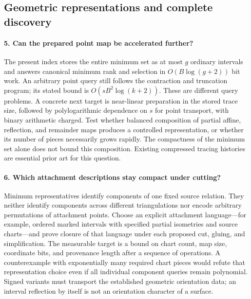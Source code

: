 \subsection{Geometric representations and complete discovery}

\paragraph{5. Can the prepared point map be accelerated further?}
The present index stores the entire minimum set as at most $g$ ordinary
intervals and answers canonical minimum rank and selection in
$O(B\log(g+2))$ bit work. An arbitrary point query still follows the
contraction and truncation program; its stated bound is
$O(sB^2\log(k+2))$. These are different query problems. A concrete next
target is near-linear preparation in the stored trace size, followed by
polylogarithmic dependence on $s$ for point transport, with binary
arithmetic charged. Test whether balanced composition of partial affine,
reflection, and remainder maps produces a controlled representation, or
whether its number of pieces necessarily grows rapidly. The compactness
of the minimum set alone does not bound this composition. Existing
compressed tracing histories~\cite{erickson-nayyeri} are essential prior
art for this question.

\paragraph{6. Which attachment descriptions stay compact under cutting?}
Minimum representatives identify components of one fixed source relation.
They neither identify components across different triangulations nor
encode arbitrary permutations of attachment points. Choose an explicit
attachment language---for example, ordered marked intervals with specified
partial isometries and source charts---and prove closure of that language
under each proposed cut, gluing, and simplification. The measurable target
is a bound on chart count, map size, coordinate bits, and provenance length
after a sequence of operations. A counterexample with exponentially many
required chart pieces would refute that representation choice even if all
individual component queries remain polynomial. Signed variants must
transport the established geometric orientation data; an interval
reflection by itself is not an orientation character of a surface.

